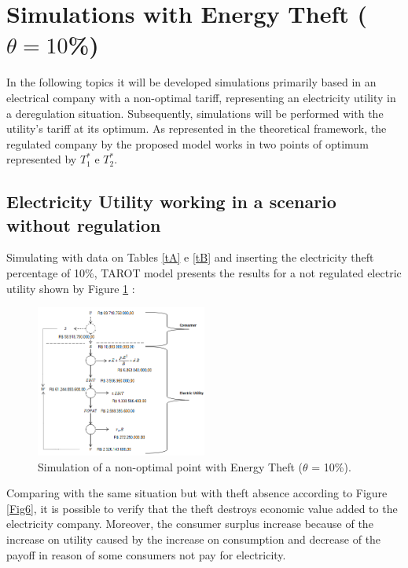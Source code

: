 \documentclass[10pt, letterpaper]{elsarticle}
\begin{document}
\section{Simulations with Energy Theft ($\theta = 10$\%)}
\label{S.4}

In the following topics it will be developed simulations primarily based in an electrical company with a non-optimal tariff, representing an electricity utility in a deregulation situation. Subsequently, simulations will be performed with the utility's tariff at its optimum. As represented in the theoretical framework, the regulated company by the proposed model works in two points of optimum represented by $T_1^*$ e $T_2^*$.\\ 

\subsection{Electricity Utility working in a scenario without regulation}
\label{sec4-1}
Simulating with data on Tables \ref{tA} e \ref{tB} and inserting the electricity theft percentage of 10\%,   TAROT model presents the results for a not regulated electric utility shown by Figure \ref{Fig9} :\\

\begin{figure}[h]%
\centering
\includegraphics[width = 0.5\textwidth]{Fig9.png} 
\caption{Simulation of a non-optimal point with Energy Theft ($\theta$ = 10\%).}
\label{Fig9}
\end{figure}

Comparing with the same situation but with theft absence according to Figure \ref{Fig6}, it is possible to verify that the theft destroys economic value added to the electricity company. Moreover, the consumer surplus increase because of the increase on utility caused by the increase on consumption and decrease of the payoff in reason of some consumers not pay for electricity.
\end{document}
